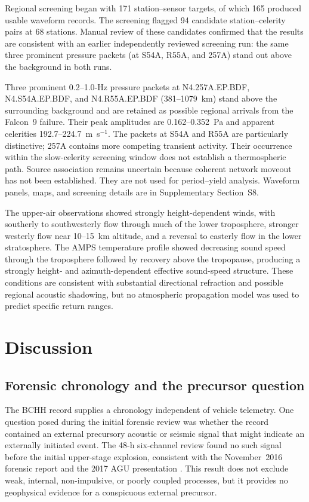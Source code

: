 \documentclass[]{seismica}
\begin{document}
Regional screening began with 171 station--sensor targets, of which 165
produced usable waveform records. The screening flagged 94 candidate
station--celerity pairs at 68 stations. Manual review of these candidates
confirmed that the results are consistent with an earlier independently
reviewed screening run: the same three prominent pressure packets (at S54A,
R55A, and 257A) stand out above the background in both runs.

Three prominent 0.2--1.0-Hz pressure packets at N4.257A.EP.BDF,
N4.S54A.EP.BDF, and N4.R55A.EP.BDF (381--1079~km) stand above the surrounding
background and are retained as possible regional arrivals from the Falcon~9
failure. Their peak amplitudes are 0.162--0.352~Pa and apparent celerities
192.7--224.7~m~s$^{-1}$. The packets at S54A and R55A are particularly
distinctive; 257A contains more competing transient activity. Their occurrence
within the slow-celerity screening window does not establish a thermospheric
path. Source association remains uncertain because coherent network moveout
has not been established. They are not used for period--yield analysis.
Waveform panels, maps, and screening details are in Supplementary Section~S8.

The upper-air observations showed strongly height-dependent winds, with
southerly to southwesterly flow through much of the lower troposphere, stronger
westerly flow near 10--15~km altitude, and a reversal to easterly flow in the
lower stratosphere. The AMPS temperature profile showed decreasing sound speed
through the troposphere followed by recovery above the tropopause, producing a
strongly height- and azimuth-dependent effective sound-speed structure. These
conditions are consistent with substantial directional refraction and possible
regional acoustic shadowing, but no atmospheric propagation model was used to
predict specific return ranges.


\section{Discussion}
\label{sec:discussion}

\subsection{Forensic chronology and the precursor question}

The BCHH record supplies a chronology independent of vehicle telemetry. One
question posed during the initial forensic review was whether the record
contained an external precursory acoustic or seismic signal that might indicate
an externally initiated event. The 48-h six-channel review found no such signal
before the initial upper-stage explosion, consistent with the November~2016
forensic report \citep{thompson_mcnutt_fireball_2016} and the 2017 AGU
presentation \citep{thompson_agu_falcon9_2017}. This result does not exclude
weak, internal, non-impulsive, or poorly coupled processes, but it provides no
geophysical evidence for a conspicuous external precursor.
\end{document}
